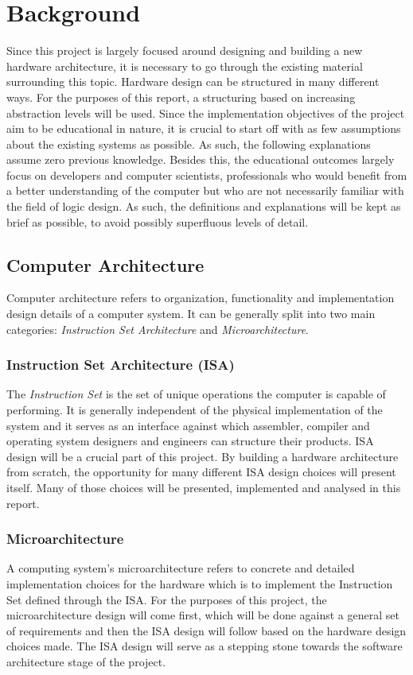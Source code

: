 \chapter{Background} \label{background}
Since this project is largely focused around designing and building a new hardware architecture,
it is necessary to go through the existing material surrounding this topic. Hardware design can
be structured in many different ways. For the purposes of this report, a structuring based on increasing
abstraction levels will be used. Since the implementation objectives of the project aim to be educational in nature,
it is crucial to start off with as few assumptions about the existing systems as possible. As such, the following explanations assume zero previous knowledge. Besides this, the educational outcomes largely focus on developers and computer scientists, professionals who would benefit from a better understanding of the computer but who are not necessarily familiar with the field of logic design. As such, the definitions and explanations will be kept as brief as possible, to avoid possibly superfluous levels of detail.

\section{Computer Architecture}
Computer architecture refers to organization, functionality and implementation design details of a computer system. It can be generally split into two main categories: \emph{Instruction Set Architecture} and \emph{Microarchitecture}.

\subsection{Instruction Set Architecture (ISA)}
The \emph{Instruction Set} is the set of unique operations the computer is capable of performing. It is generally independent of the physical implementation of the system and it serves as an interface against which assembler, compiler and operating system designers and engineers can structure their products. ISA design will be a crucial part of this project. By building a hardware architecture from scratch, the opportunity for many different ISA design choices will present itself. Many of those choices will be presented, implemented and analysed in this report.

\subsection{Microarchitecture}
A computing system's microarchitecture refers to concrete and detailed implementation choices for the hardware which is to implement the Instruction Set defined through the ISA. For the purposes of this project, the microarchitecture design will come first, which will be done against a general set of requirements and then the ISA design will follow based on the hardware design choices made. The ISA design will serve as a stepping stone towards the software architecture stage of the project.

